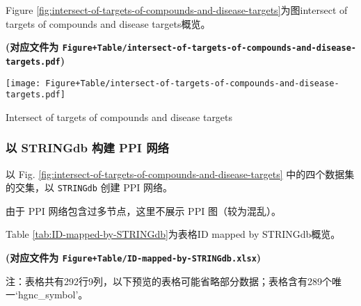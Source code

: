 \documentclass[
]{article}
\begin{document}
Figure \ref{fig:intersect-of-targets-of-compounds-and-disease-targets}为图intersect of targets of compounds and disease targets概览。

\textbf{(对应文件为 \texttt{Figure+Table/intersect-of-targets-of-compounds-and-disease-targets.pdf})}

\def\@captype{figure}
\begin{center}
\texttt{[image: Figure+Table/intersect-of-targets-of-compounds-and-disease-targets.pdf]}
\caption{Intersect of targets of compounds and disease targets}\label{fig:intersect-of-targets-of-compounds-and-disease-targets}
\end{center}

\hypertarget{ux4ee5-stringdb-ux6784ux5efa-ppi-ux7f51ux7edc}{%
\subsubsection{以 STRINGdb 构建 PPI 网络}\label{ux4ee5-stringdb-ux6784ux5efa-ppi-ux7f51ux7edc}}

以 Fig. \ref{fig:intersect-of-targets-of-compounds-and-disease-targets} 中的四个数据集的交集，以 \texttt{STRINGdb} 创建 PPI 网络。

由于 PPI 网络包含过多节点，这里不展示 PPI 图（较为混乱）。

Table \ref{tab:ID-mapped-by-STRINGdb}为表格ID mapped by STRINGdb概览。

\textbf{(对应文件为 \texttt{Figure+Table/ID-mapped-by-STRINGdb.xlsx})}

\begin{center}\begin{tcolorbox}[colback=gray!10, colframe=gray!50, width=0.9\linewidth, arc=1mm, boxrule=0.5pt]注：表格共有292行9列，以下预览的表格可能省略部分数据；表格含有289个唯一`hgnc\_symbol'。
\end{tcolorbox}
\end{center}
\end{document}
